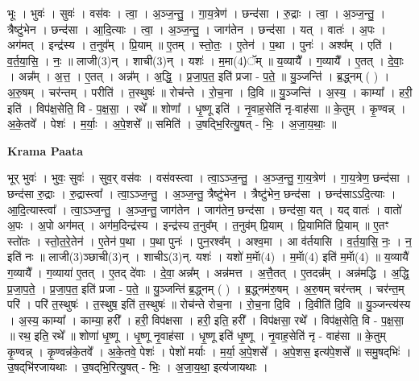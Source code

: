 \documentclass[17pt]{extarticle}
\begin{document}
भूः । भुवः॑ । सुवः॑ । वस॑वः । त्वा॒ । अ॒ञ्ज॒न्तु॒ । गा॒य॒त्रेण॑ । छन्द॑सा । रु॒द्राः । त्वा॒ । अ॒ञ्ज॒न्तु॒ । त्रैष्टु॑भेन । छन्द॑सा । आ॒दि॒त्याः । त्वा॒ । अ॒ञ्ज॒न्तु॒ । जाग॑तेन । छन्द॑सा । यत् । वातः॑ । अ॒पः । अग॑मत् । इन्द्र॑स्य । त॒नुव᳚म् । प्रि॒याम् ॥ ए॒तम् । स्तो॒तः॒ । ए॒तेन॑ । प॒था । पुनः॑ । अश्व᳚म् । एति॑ । व॒र्त॒या॒सि॒ । नः॒ ॥ लाजी(3)न् । शाची(3)न् । यशः॑ । म॒मा(4)ॅम् ॥ य॒व्यायै᳚ । ग॒व्यायै᳚ । ए॒तत् । दे॒वाः॒ । अन्न᳚म् । अ॒त्त॒ । ए॒तत् । अन्न᳚म् । अ॒द्धि॒ । प्र॒जा॒प॒त॒ इति॑ प्रजा - प॒ते॒ ॥ यु॒ञ्जन्ति॑ । ब्र॒द्ध्नम् ( ) । अ॒रु॒षम् । चर॑न्तम् । परीति॑ । त॒स्थुषः॑ ॥ रोच॑न्ते । रो॒च॒ना । दि॒वि ॥ यु॒ञ्जन्ति॑ । अ॒स्य॒ । काम्या᳚ । हरी॒ इति॑ । विप॑क्ष॒सेति॒ वि - प॒क्ष॒सा॒ । रथे᳚ ॥ शोणा᳚ । धृ॒ष्णू इति॑ । नृ॒वाह॒सेति॑ नृ-वाह॑सा ॥ के॒तुम् । कृ॒ण्वन्न् । अ॒के॒तवे᳚ । पेशः॑ । म॒र्याः॒ । अ॒पे॒शसे᳚ ॥ समिति॑ । उ॒षद्भि॒रित्यु॒षत् - भिः॒ । अ॒जा॒य॒थाः॒ ॥  \newline


\textbf{Krama Paata} \newline

भूर् भुवः॑ । भुवः॒ सुवः॑ । सुव॒र् वस॑वः । वस॑वस्त्वा । त्वा॒ऽञ्ज॒न्तु॒ । अ॒ञ्ज॒न्तु॒ गा॒य॒त्रेण॑ । गा॒य॒त्रेण॒ छन्द॑सा । छन्द॑सा रु॒द्राः । रु॒द्रास्त्वा᳚ । त्वा॒ऽञ्ज॒न्तु॒ । अ॒ञ्ज॒न्तु॒ त्रैष्टु॑भेन । त्रैष्टु॑भेन॒ छन्द॑सा । छन्द॑साऽऽदि॒त्याः । आ॒दि॒त्यास्त्वा᳚ । त्वा॒ऽञ्ज॒न्तु॒ । अ॒ञ्ज॒न्तु॒ जाग॑तेन । जाग॑तेन॒ छन्द॑सा । छन्द॑सा॒ यत् । यद् वातः॑ । वातो॑ अ॒पः । अ॒पो अग॑मत् । अग॑म॒दिन्द्र॑स्य । इन्द्र॑स्य त॒नुव᳚म् । त॒नुव॑म् प्रि॒याम् । प्रि॒यामिति॑ प्रि॒याम् ॥ ए॒तꣳ स्तो॑तः । स्तो॒त॒रे॒तेन॑ । ए॒तेन॑ प॒था । प॒था पुनः॑ । पुन॒रश्व᳚म् । अश्व॒मा । आ व॑र्तयासि । व॒र्त॒या॒सि॒ नः॒ । न॒ इति॑ नः ॥ लाजी(3)ञ्छाची(3)न् । शाचीऽ(3)न्. यशः॑ । यशो॑ म॒माॅ(4) । म॒माॅ(4) इति॑ म॒माॅ(4) ॥ य॒व्यायै॑ ग॒व्यायै᳚ । ग॒व्याया॑ ए॒तत् । ए॒तद् दे॑वाः । दे॒वा॒ अन्न᳚म् । अन्न॑मत्त । अ॒त्तै॒तत् । ए॒तदन्न᳚म् । अन्न॑मद्धि । अ॒द्धि॒ प्र॒जा॒प॒ते॒ । प्र॒जा॒प॒त॒ इति॑ प्रजा - प॒ते॒ ॥ यु॒ञ्जन्ति॑ ब्र॒द्ध्नम् ( ) । ब्र॒द्ध्नम॑रु॒षम् । अ॒रु॒षम् चर॑न्तम् । चर॑न्त॒म् परि॑ । परि॑ त॒स्थुषः॑ । त॒स्थुष॒ इति॑ त॒स्थुषः॑ ॥ रोच॑न्ते रोच॒ना । रो॒च॒ना दि॒वि । दि॒वीति॑ दि॒वि ॥ यु॒ञ्जन्त्य॑स्य । अ॒स्य॒ काम्या᳚ । काम्या॒ हरी᳚ । हरी॒ विप॑क्षसा । हरी॒ इति॒ हरी᳚ । विप॑क्षसा॒ रथे᳚ । विप॑क्ष॒सेति॒ वि - प॒क्ष॒सा॒ ॥ रथ॒ इति॒ रथे᳚ ॥ शोणा॑ धृ॒ष्णू । धृ॒ष्णू नृ॒वाह॑सा । धृ॒ष्णू इति॑ धृ॒ष्णू । नृ॒वाह॒सेति॑ नृ - वाह॑सा ॥ के॒तुम् कृ॒ण्वन्न् । कृ॒ण्वन्न॑के॒तवे᳚ । अ॒के॒तवे॒ पेशः॑ । पेशो॑ मर्याः । म॒र्या॒ अ॒पे॒शसे᳚ । अ॒पे॒शस॒ इत्य॑पे॒शसे᳚ ॥ समु॒षद्‌भिः॑ । उ॒षद्‌भि॑रजायथाः । उ॒षद्‌भि॒रित्यु॒षत् - भिः॒ । अ॒जा॒य॒था॒ इत्य॑जायथाः । \newline
\end{document}
